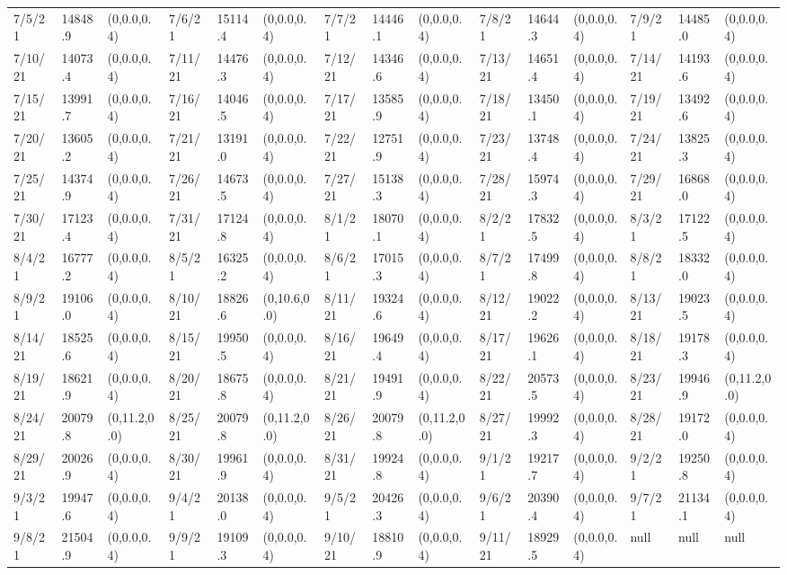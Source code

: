 \documentclass[12pt]{article}
\begin{document}
\begin{table}
\begin{center}
\begin{tabular}{p{15pt}p{15pt}p{25pt}p{15pt}p{15pt}p{25pt}p{15pt}p{15pt}p{25pt}p{15pt}p{15pt}p{25pt}p{15pt}p{15pt}p{25pt}}
                7/5/21&14848.9&(0,0.0,0.4)&7/6/21&15114.4&(0,0.0,0.4)&7/7/21&14446.1&(0,0.0,0.4)&7/8/21&14644.3&(0,0.0,0.4)&7/9/21&14485.0&(0,0.0,0.4)\\
                7/10/21&14073.4&(0,0.0,0.4)&7/11/21&14476.3&(0,0.0,0.4)&7/12/21&14346.6&(0,0.0,0.4)&7/13/21&14651.4&(0,0.0,0.4)&7/14/21&14193.6&(0,0.0,0.4)\\
                7/15/21&13991.7&(0,0.0,0.4)&7/16/21&14046.5&(0,0.0,0.4)&7/17/21&13585.9&(0,0.0,0.4)&7/18/21&13450.1&(0,0.0,0.4)&7/19/21&13492.6&(0,0.0,0.4)\\
                7/20/21&13605.2&(0,0.0,0.4)&7/21/21&13191.0&(0,0.0,0.4)&7/22/21&12751.9&(0,0.0,0.4)&7/23/21&13748.4&(0,0.0,0.4)&7/24/21&13825.3&(0,0.0,0.4)\\
                7/25/21&14374.9&(0,0.0,0.4)&7/26/21&14673.5&(0,0.0,0.4)&7/27/21&15138.3&(0,0.0,0.4)&7/28/21&15974.3&(0,0.0,0.4)&7/29/21&16868.0&(0,0.0,0.4)\\
                7/30/21&17123.4&(0,0.0,0.4)&7/31/21&17124.8&(0,0.0,0.4)&8/1/21&18070.1&(0,0.0,0.4)&8/2/21&17832.5&(0,0.0,0.4)&8/3/21&17122.5&(0,0.0,0.4)\\
                8/4/21&16777.2&(0,0.0,0.4)&8/5/21&16325.2&(0,0.0,0.4)&8/6/21&17015.3&(0,0.0,0.4)&8/7/21&17499.8&(0,0.0,0.4)&8/8/21&18332.0&(0,0.0,0.4)\\
                8/9/21&19106.0&(0,0.0,0.4)&8/10/21&18826.6&(0,10.6,0.0)&8/11/21&19324.6&(0,0.0,0.4)&8/12/21&19022.2&(0,0.0,0.4)&8/13/21&19023.5&(0,0.0,0.4)\\
                8/14/21&18525.6&(0,0.0,0.4)&8/15/21&19950.5&(0,0.0,0.4)&8/16/21&19649.4&(0,0.0,0.4)&8/17/21&19626.1&(0,0.0,0.4)&8/18/21&19178.3&(0,0.0,0.4)\\
                8/19/21&18621.9&(0,0.0,0.4)&8/20/21&18675.8&(0,0.0,0.4)&8/21/21&19491.9&(0,0.0,0.4)&8/22/21&20573.5&(0,0.0,0.4)&8/23/21&19946.9&(0,11.2,0.0)\\
                8/24/21&20079.8&(0,11.2,0.0)&8/25/21&20079.8&(0,11.2,0.0)&8/26/21&20079.8&(0,11.2,0.0)&8/27/21&19992.3&(0,0.0,0.4)&8/28/21&19172.0&(0,0.0,0.4)\\
                8/29/21&20026.9&(0,0.0,0.4)&8/30/21&19961.9&(0,0.0,0.4)&8/31/21&19924.8&(0,0.0,0.4)&9/1/21&19217.7&(0,0.0,0.4)&9/2/21&19250.8&(0,0.0,0.4)\\
                9/3/21&19947.6&(0,0.0,0.4)&9/4/21&20138.0&(0,0.0,0.4)&9/5/21&20426.3&(0,0.0,0.4)&9/6/21&20390.4&(0,0.0,0.4)&9/7/21&21134.1&(0,0.0,0.4)\\
                9/8/21&21504.9&(0,0.0,0.4)&9/9/21&19109.3&(0,0.0,0.4)&9/10/21&18810.9&(0,0.0,0.4)&9/11/21&18929.5&(0,0.0,0.4)&null & null&null\\
                \bottomrule 
                \end{tabular}
                \end{center}
                \end{table}
\end{document}
